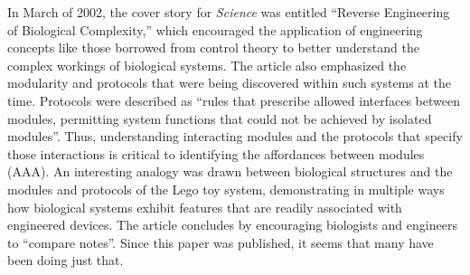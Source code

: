 In March of 2002, the cover story for \textit{Science} was entitled
“Reverse Engineering of Biological Complexity,”\citep{csetedoyle2002}
which encouraged the application of engineering concepts like those
borrowed from control theory to better understand the complex workings
of biological systems. The article also emphasized the modularity and
protocols that were being discovered within such systems at the time.
Protocols were described as “rules that prescribe allowed interfaces
between modules, permitting system functions that could not be achieved
by isolated modules”. Thus, understanding interacting modules and the
protocols that specify those interactions is critical to identifying
the affordances between modules (AAA). An interesting analogy was drawn
between biological structures and the modules and protocols of the Lego
toy system, demonstrating in multiple ways how biological systems
exhibit features that are readily associated with engineered devices.
The article concludes by encouraging biologists and engineers to
“compare notes”. Since this paper was published, it seems that many
have been doing just that. 

